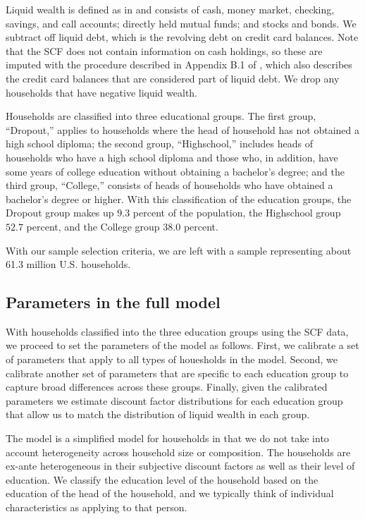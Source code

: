 \documentclass[\econtexRoot/HAFiscal]{subfiles}
\begin{document}
Liquid wealth is defined as in \cite{kaplan2014model} and consists of cash, money market, checking, savings, and call accounts; directly held mutual funds; and stocks and bonds.
We subtract off liquid debt, which is the revolving debt on credit card balances.
Note that the SCF does not contain information on cash holdings, so these are imputed with the procedure described in Appendix B.1 of \cite{kaplan2014model}, which also describes the credit card balances that are considered part of liquid debt.
We drop any households that have negative liquid wealth.


Households are classified into three educational groups.
The first group, ``Dropout,'' applies to households where the head of household has not obtained a high school diploma; the second group, ``Highschool,'' includes heads of households who have a high school diploma and those who, in addition, have some years of college education without obtaining a bachelor's degree; and the third group, ``College,'' consists of heads of households who have obtained a bachelor's degree or higher.
With this classification of the education groups, the Dropout group makes up $9.3$ percent of the population, the Highschool group $52.7$ percent, and the College group $38.0$ percent.


With our sample selection criteria, we are left with a sample representing about 61.3 million U.S.
households.

\subsection{Parameters in the full model}
\notinsubfile{\label{sec:paramsFull}}

With households classified into the three education groups using the SCF data, we proceed to set the parameters of the model as follows.
First, we calibrate a set of parameters that apply to all types of houesholds in the model.
Second, we calibrate another set of parameters that are specific to each education group to capture broad differences across these groups.
Finally, given the calibrated parameters we estimate discount factor distributions for each education group that allow us to match the distribution of liquid wealth in each group.


The model is a simplified model for households in that we do not take into account heterogeneity across household size or composition.
The households are ex-ante heterogeneous in their subjective discount factors as well as their level of education.
We classify the education level of the household based on the education of the head of the household, and we typically think of individual characteristics as applying to that person.
\end{document}
